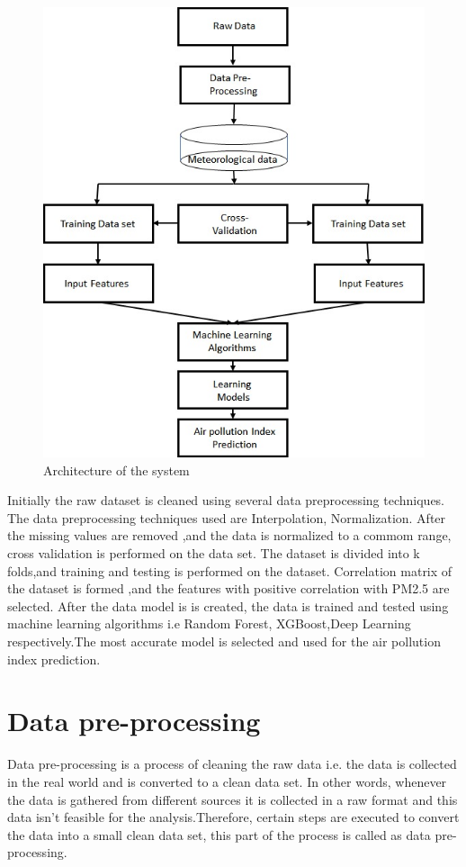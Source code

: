 \begin{figure}[h!]
\label{bc}
\centering
\includegraphics[width= 20 cm]{design2.jpeg}
\caption{Architecture of the system}
\end{figure}

\pagebreak

Initially the raw dataset is cleaned using several data preprocessing techniques. The data preprocessing techniques used are Interpolation, Normalization. After the missing values are removed ,and the data is normalized to a commom range, cross validation is performed on the data set. The dataset is divided into k folds,and training and testing is performed on the dataset. Correlation matrix of the dataset is formed ,and the features with positive correlation with PM2.5 are selected. After the data model is is created, the data is trained and tested using machine learning algorithms i.e Random Forest, XGBoost,Deep Learning respectively.The most accurate model is selected and used for the air pollution index prediction.

\section {Data pre-processing}
Data pre-processing is a process of cleaning the raw data i.e. the data is collected in the real world and is converted to a clean data set. In other words, whenever the data is gathered from different sources it is collected in a raw format and this data isn’t feasible for the analysis.Therefore, certain steps are executed to convert the data into a small clean data set, this part of the process is called as data pre-processing.

